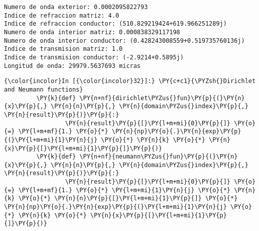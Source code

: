 \documentclass[11pt]{report}
\begin{document}
    \begin{Verbatim}[commandchars=\\\{\}]
Numero de onda exterior: 0.0002095822793
Indice de refraccion matriz: 4.0
Indice de refraccion conductor: (510.829219424+619.966251289j)
Numero de onda interior matriz: 0.000838329117198
Numero de onda interior conductor: (0.428243008559+0.519735760136j)
Indice de transmision matriz: 1.0
Indice de transmision conductor: (-2.9214+0.5895j)
Longitud de onda: 29979.5637693 micras

    \end{Verbatim}
\begin{tcolorbox}
    \begin{Verbatim}[commandchars=\\\{\}]
{\color{incolor}In [{\color{incolor}32}]:} \PY{c+c1}{\PYZsh{}Dirichlet and Neumann functions}
         \PY{k}{def} \PY{n+nf}{dirichlet\PYZus{}fun}\PY{p}{(}\PY{n}{x}\PY{p}{,} \PY{n}{n}\PY{p}{,} \PY{n}{domain\PYZus{}index}\PY{p}{,} \PY{n}{result}\PY{p}{)}\PY{p}{:}
                 \PY{n}{result}\PY{p}{[}\PY{l+m+mi}{0}\PY{p}{]} \PY{o}{=} \PY{l+m+mf}{1.} \PY{o}{*} \PY{n}{np}\PY{o}{.}\PY{n}{exp}\PY{p}{(}\PY{l+m+mi}{1}\PY{n}{j} \PY{o}{*} \PY{n}{k} \PY{o}{*} \PY{n}{x}\PY{p}{[}\PY{l+m+mi}{1}\PY{p}{]}\PY{p}{)}
         \PY{k}{def} \PY{n+nf}{neumann\PYZus{}fun}\PY{p}{(}\PY{n}{x}\PY{p}{,} \PY{n}{n}\PY{p}{,} \PY{n}{domain\PYZus{}index}\PY{p}{,} \PY{n}{result}\PY{p}{)}\PY{p}{:}
                 \PY{n}{result}\PY{p}{[}\PY{l+m+mi}{0}\PY{p}{]} \PY{o}{=} \PY{l+m+mf}{1.} \PY{o}{*} \PY{l+m+mi}{1}\PY{n}{j} \PY{o}{*} \PY{n}{k} \PY{o}{*} \PY{n}{n}\PY{p}{[}\PY{l+m+mi}{1}\PY{p}{]} \PY{o}{*} \PY{n}{np}\PY{o}{.}\PY{n}{exp}\PY{p}{(}\PY{l+m+mi}{1}\PY{n}{j} \PY{o}{*} \PY{n}{k} \PY{o}{*} \PY{n}{x}\PY{p}{[}\PY{l+m+mi}{1}\PY{p}{]}\PY{p}{)}
\end{Verbatim}
\end{tcolorbox}
\end{document}
